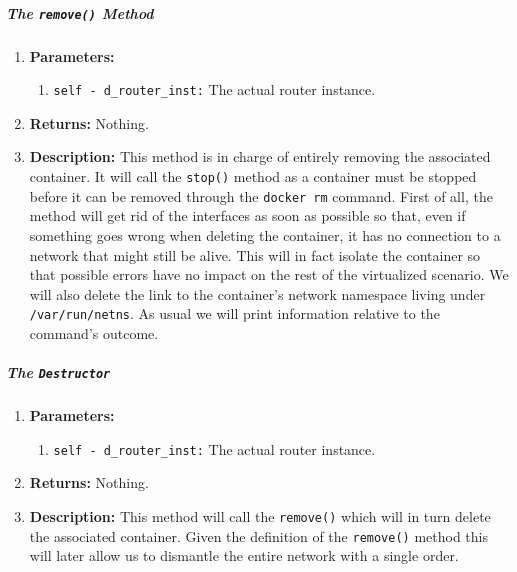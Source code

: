         \subparagraph{The \texttt{remove()} Method}
            \begin{enumerate}
                \item \textbf{Parameters:}
                \begin{enumerate}
                    \item \texttt{self - d\_router\_inst:} The actual router instance.
                \end{enumerate}
                \item \textbf{Returns:} Nothing.
                \item \textbf{Description:} This method is in charge of entirely removing the associated container. It will call the \texttt{stop()} method as a container must be stopped before it can be removed through the \texttt{docker rm} command. First of all, the method will get rid of the interfaces as soon as possible so that, even if something goes wrong when deleting the container, it has no connection to a network that might still be alive. This will in fact isolate the container so that possible errors have no impact on the rest of the virtualized scenario. We will also delete the link to the container's network namespace living under \texttt{/var/run/netns}. As usual we will print information relative to the command's outcome.
            \end{enumerate}

        \subparagraph{The \texttt{Destructor}}
            \begin{enumerate}
                \item \textbf{Parameters:}
                \begin{enumerate}
                    \item \texttt{self - d\_router\_inst:} The actual router instance.
                \end{enumerate}
                \item \textbf{Returns:} Nothing.
                \item \textbf{Description:} This method will call the \texttt{remove()} which will in turn delete the associated container. Given the definition of the \texttt{remove()} method this will later allow us to dismantle the entire network with a single order.
            \end{enumerate}
